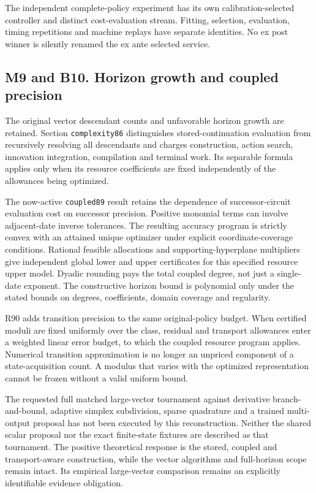 The independent complete-policy experiment has its own
calibration-selected controller and distinct cost-evaluation stream.
Fitting, selection, evaluation, timing repetitions and machine replays
have separate identities. No ex post winner is silently renamed the ex
ante selected service.

\hypertarget{m9-and-b10.-horizon-growth-and-coupled-precision}{%
\subsection{M9 and B10. Horizon growth and coupled
precision}\label{m9-and-b10.-horizon-growth-and-coupled-precision}}

The original vector descendant counts and unfavorable horizon growth are
retained. Section \texttt{complexity86} distinguishes
stored-continuation evaluation from recursively resolving all
descendants and charges construction, action search, innovation
integration, compilation and terminal work. Its separable formula
applies only when its resource coefficients are fixed independently of
the allowances being optimized.

The now-active \texttt{coupled89} result retains the dependence of
successor-circuit evaluation cost on successor precision. Positive
monomial terms can involve adjacent-date inverse tolerances. The
resulting accuracy program is strictly convex with an attained unique
optimizer under explicit coordinate-coverage conditions. Rational
feasible allocations and supporting-hyperplane multipliers give
independent global lower and upper certificates for this specified
resource upper model. Dyadic rounding pays the total coupled degree, not
just a single-date exponent. The constructive horizon bound is
polynomial only under the stated bounds on degrees, coefficients, domain
coverage and regularity.

R90 adds transition precision to the same original-policy budget. When
certified moduli are fixed uniformly over the class, residual and
transport allowances enter a weighted linear error budget, to which the
coupled resource program applies. Numerical transition approximation is
no longer an unpriced component of a state-acquisition count. A modulus
that varies with the optimized representation cannot be frozen without a
valid uniform bound.

The requested full matched large-vector tournament against derivative
branch-and-bound, adaptive simplex subdivision, sparse quadrature and a
trained multi-output proposal has not been executed by this
reconstruction. Neither the shared scalar proposal nor the exact
finite-state fixtures are described as that tournament. The positive
theoretical response is the stored, coupled and transport-aware
construction, while the vector algorithms and full-horizon scope remain
intact. Its empirical large-vector comparison remains an explicitly
identifiable evidence obligation.

